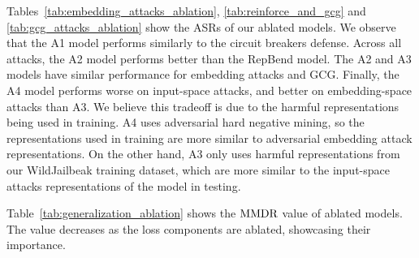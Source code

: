 \documentclass[11pt]{article}
\begin{document}
Tables~\ref{tab:embedding_attacks_ablation}, \ref{tab:reinforce_and_gcg} and \ref{tab:gcg_attacks_ablation} show the ASRs of our 
ablated models. We observe that the A1 model performs similarly to the circuit breakers defense.
Across all attacks, the A2 model performs better than the RepBend model.
The A2 and A3 models have similar performance for embedding attacks and GCG.
Finally, the A4 model performs worse on input-space attacks, and better on embedding-space
attacks than A3. We believe this tradeoff is due to the harmful representations being used in training. A4 uses adversarial hard negative mining, so the representations used in training are more similar to adversarial embedding attack representations. On the other hand, A3 only uses harmful representations from our WildJailbeak training dataset, which are more similar to the input-space attacks representations of the model in testing.

Table~\ref{tab:generalization_ablation} shows the $\text{MMDR}$ value of ablated models.
The value decreases as the loss components are ablated, showcasing their importance.
\end{document}
